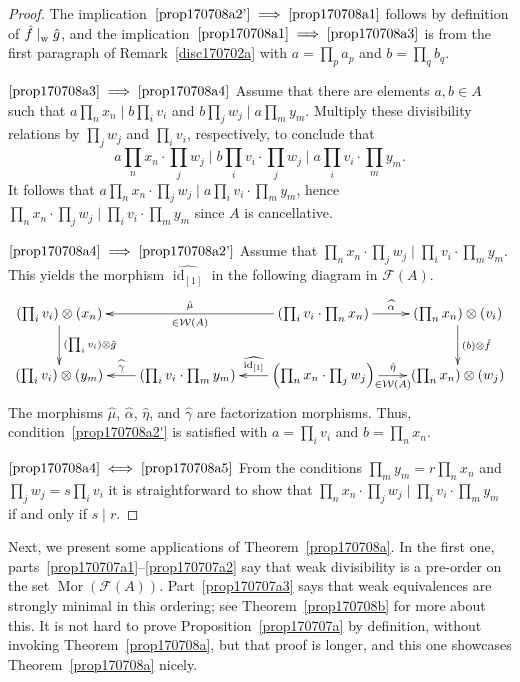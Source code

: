 \documentclass[reqno]{amsart}
\theoremstyle{plain}
\theoremstyle{definition}
\newcommand{\cat}[1]{\mathcal{#1}}
\newcommand{\catw}{\cat{W}}
\newcommand{\catf}{\cat{F}}
\newcommand{\id}{\operatorname{id}}
\numberwithin{equation}{lem}
\newcommand{\divs}{\mid_{\text w}^{}}
\begin{document}
\begin{proof}
The 
implication~$\eqref{prop170708a2'}\implies\eqref{prop170708a1}$
follows by definition of $\hat f\divs\hat g$,
and the implication~$\eqref{prop170708a1}\implies\eqref{prop170708a3}$
is from the first paragraph of Remark~\ref{disc170702a} with $a=\prod_pa_p$ and $b=\prod_qb_q$.

$\eqref{prop170708a3}\implies\eqref{prop170708a4}$
Assume that there are elements $a,b\in A$ such that $a\prod_nx_n\mid b\prod_iv_i$ and $b\prod_jw_j\mid a\prod_my_m$.
Multiply these divisibility relations by $\prod_jw_j$ and $\prod_iv_i$, respectively, to conclude that
$$
\textstyle
a\prod_nx_n\cdot\prod_jw_j\mid b\prod_iv_i\cdot\prod_jw_j
\mid a\prod_iv_i\cdot\prod_my_m.
$$
It follows that $a\prod_nx_n\cdot\prod_jw_j\mid a\prod_iv_i\cdot\prod_my_m$,
hence $\prod_nx_n\cdot\prod_jw_j\mid \prod_iv_i\cdot\prod_my_m$ since $A$ is cancellative.

$\eqref{prop170708a4}\implies\eqref{prop170708a2'}$
Assume that $\prod_nx_n\cdot\prod_jw_j\mid\prod_iv_i\cdot\prod_my_m$.
This yields the  morphism $\widehat{\id_{[1]}}$ in the following diagram in $\catf(A)$.
$$
\xymatrix@C=7mm{
\left(\prod_iv_i\right)\otimes(x_n)\ar[d]^-{(\prod_iv_i)\otimes\hat g}
&&\ar[ll]_-{\hat{\mu}}^-{\in\catw(A)}\left(\prod_iv_i\cdot\prod_nx_n\right)\ar[r]^-{\widehat{\alpha}}
&\left(\prod_nx_n\right)\otimes(v_i)\ar[d]^-{(b)\otimes\hat f}
\\
\left(\prod_iv_i\right)\otimes(y_m)
&\ar[l]_-{\widehat{\gamma}}\left(\prod_iv_i\cdot\prod_my_m\right)
&\ar[l]_-{\widehat{\id_{[1]}}}\left(\prod_nx_n\cdot\prod_jw_j\right)\ar[r]^-{\hat{\eta}}_-{\in\catw(A)}
&\left(\prod_nx_n\right)\otimes(w_j)
}
$$
The morphisms $\hat\mu$, $\hat\alpha$, $\hat\eta$, and $\hat\gamma$ are factorization morphisms.
Thus, condition~\eqref{prop170708a2'} is satisfied with
$a=\prod_iv_i$
and
$b=\prod_nx_n$.

$\eqref{prop170708a4}\iff\eqref{prop170708a5}$
From the conditions $\prod_my_m=r\prod_nx_n$ and $\prod_jw_j=s\prod_iv_i$ it is straightforward to show that 
$\prod_nx_n\cdot\prod_jw_j\mid\prod_iv_i\cdot\prod_my_m$ if and only if $s\mid r$.
\end{proof}

Next, we present
some applications of Theorem~\ref{prop170708a}.
In the first one, parts~\eqref{prop170707a1}--\eqref{prop170707a2} say that
weak divisibility is a pre-order on the set $\operatorname{Mor}(\catf(A))$.
Part~\eqref{prop170707a3} says that weak equivalences are strongly minimal in this ordering;
see Theorem~\ref{prop170708b} for more about this.
It is not hard to prove Proposition~\ref{prop170707a} by definition, without invoking Theorem~\ref{prop170708a}, but 
that proof is longer, and this one showcases Theorem~\ref{prop170708a} nicely.
\end{document}
